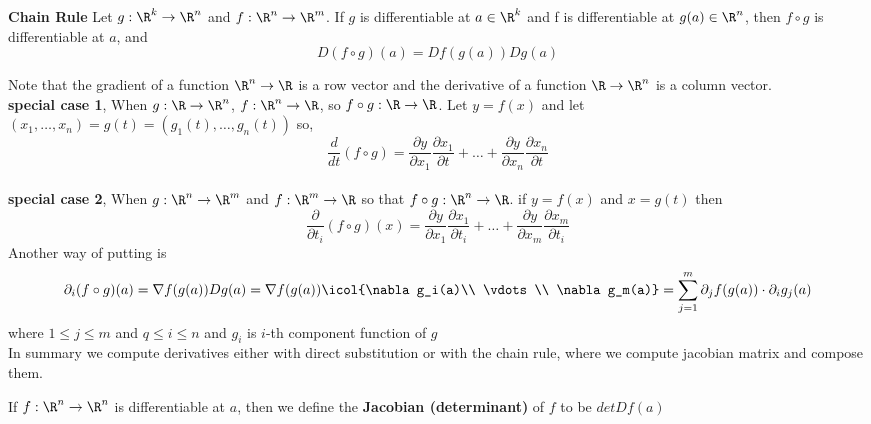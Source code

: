 \documentclass[11pt]{article}
\begin{document}
\begin{theorem*}
  \label{chain rule}
  \textbf{Chain Rule} Let $g:\R^k \to \R^n$ and $f:\R^n\to \R^m$. If $g$ is differentiable at $a\in\R^k$ and f is differentiable at $g(a)\in \R^n$, then $f\circ g$ is differentiable at $a$, and
  \[
    D(f\circ g)(a) = Df(g(a))Dg(a)
  \]
  \begin{rem}
    Note that the gradient of a function $\R^n\to\R$ is a row vector and the derivative of a function $\R\to\R^n$ is a column vector.
    $ $\\
    \textbf{special case 1}, When $g:\R \to\R^n$, $f:\R^n \to \R$, so $f\circ g: \R \to \R$. Let $y = f(x)$ and let $(x_1, \dots, x_n) = g(t) = (g_1(t), \dots, g_n(t))$ so,
    \[
      \frac{d}{dt}(f\circ g) = \frac{\partial y}{\partial x_1}\frac{\partial x_1}{\partial t} + \dots + \frac{\partial y}{\partial x_n}\frac{\partial x_n}{\partial t}
    \]
    $ $\\
    \textbf{special case 2}, When $g:\R^n \to \R^m$ and $f:\R^m\to\R$ so that $f\circ g: \R^n \to\R$. if $y=f(x)$ and $x=g(t)$ then
    \[
      \frac{\partial}{\partial t_i} (f\circ g)(x) = \frac{\partial y}{\partial x_1}\frac{\partial x_1}{\partial t_i} + \dots + \frac{\partial y}{\partial x_m}\frac{\partial x_m}{\partial t_i}
    \]
    Another way of putting is
    \[
      \partial_i (f\circ g)(a) = \nabla f(g(a))Dg(a) = \nabla f(g(a))\icol{\nabla g_i(a)\\ \vdots \\ \nabla g_m(a)} = \sum_{j=1}^{m} \partial_j f(g(a)) \cdot \partial_i g_j(a)
    \]
    where $1\leq j \leq m$ and $q\leq i\leq n$ and $g_i$ is $i$-th component function of $g$
    $ $\\
    In summary we compute derivatives either with direct substitution or with the chain rule, where we compute jacobian matrix and compose them.
  \end{rem}
\end{theorem*}

\begin{defn*}
  If $f: \R^n \to \R^n$ is differentiable at $a$, then we define the \textbf{Jacobian (determinant)} of $f$ to be $det Df(a)$
\end{defn*}
\end{document}
